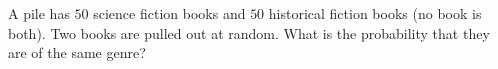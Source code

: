 A pile has $50$ science fiction books and $50$ historical fiction books (no book is both). Two books are pulled out at random. What is the probability that they are of the same genre?
